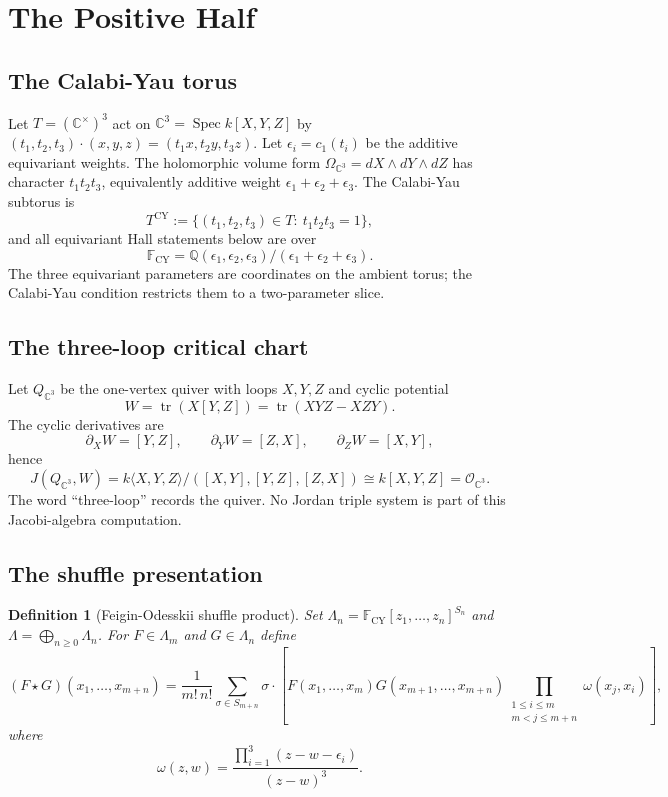 \documentclass[11pt]{article}
\newtheorem{definition}[theorem]{Definition}
\providecommand{\CY}{\mathrm{CY}}
\begin{document}
\section{The Positive Half}

\subsection{The Calabi-Yau torus}

Let $T=(\mathbb{C}^{\times})^3$ act on
$\mathbb{C}^3=\operatorname{Spec}k[X,Y,Z]$ by
$(t_1,t_2,t_3)\cdot(x,y,z)=(t_1x,t_2y,t_3z)$. Let
$\epsilon_i=c_1(t_i)$ be the additive equivariant weights. The
holomorphic volume form $\Omega_{\mathbb{C}^3}=dX\wedge dY\wedge dZ$
has character $t_1t_2t_3$, equivalently additive weight
$\epsilon_1+\epsilon_2+\epsilon_3$. The Calabi-Yau subtorus is
\[
T^{\CY}:=\{(t_1,t_2,t_3)\in T:\ t_1t_2t_3=1\},
\]
and all equivariant Hall statements below are over
\[
\mathbb{F}_{\CY}
=\mathbb{Q}(\epsilon_1,\epsilon_2,\epsilon_3)/
(\epsilon_1+\epsilon_2+\epsilon_3).
\]
The three equivariant parameters are coordinates on the ambient torus;
the Calabi-Yau condition restricts them to a two-parameter slice.

\subsection{The three-loop critical chart}

Let $Q_{\mathbb{C}^3}$ be the one-vertex quiver with loops $X,Y,Z$ and
cyclic potential
\[
W=\operatorname{tr}(X[Y,Z])=\operatorname{tr}(XYZ-XZY).
\]
The cyclic derivatives are
\[
\partial_XW=[Y,Z],\qquad
\partial_YW=[Z,X],\qquad
\partial_ZW=[X,Y],
\]
hence
\[
J(Q_{\mathbb{C}^3},W)
=k\langle X,Y,Z\rangle/([X,Y],[Y,Z],[Z,X])
\cong k[X,Y,Z]
=\mathcal{O}_{\mathbb{C}^3}.
\]
The word ``three-loop'' records the quiver. No Jordan triple system is
part of this Jacobi-algebra computation.

\subsection{The shuffle presentation}

\begin{definition}[Feigin-Odesskii shuffle product]
\label{def:fo-shuffle}
Set $\Lambda_n=\mathbb{F}_{\CY}[z_1,\ldots,z_n]^{S_n}$ and
$\Lambda=\bigoplus_{n\geq 0}\Lambda_n$. For
$F\in\Lambda_m$ and $G\in\Lambda_n$ define
\[
(F\star G)(x_1,\ldots,x_{m+n})
=\frac{1}{m!\,n!}\sum_{\sigma\in S_{m+n}}\sigma\cdot
\left[
F(x_1,\ldots,x_m)G(x_{m+1},\ldots,x_{m+n})
\prod_{\substack{1\leq i\leq m\\ m<j\leq m+n}}
\omega(x_j,x_i)
\right],
\]
where
\[
\omega(z,w)
=\frac{\prod_{i=1}^{3}(z-w-\epsilon_i)}{(z-w)^3}.
\]
\end{definition}
\end{document}
